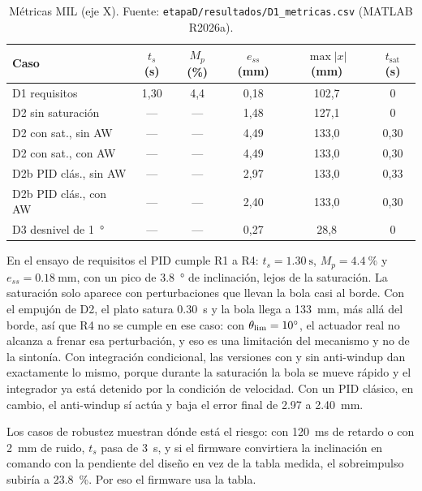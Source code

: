 \begin{table}[!t]
\caption{Métricas MIL (eje X). Fuente: \texttt{etapaD/resultados/D1\_metricas.csv}
(MATLAB R2026a).}
\label{tab:mil}
\centering
\footnotesize
\setlength{\tabcolsep}{2pt}
\begin{tabular}{@{}lccccc@{}}
\toprule
\textbf{Caso} & $t_s$ (\si{\second}) & $M_p$ (\si{\percent}) & $e_{ss}$ (\si{\milli\metre}) & $\max|x|$ (\si{\milli\metre}) & $t_{\mathrm{sat}}$ (\si{\second}) \\
\midrule
D1 requisitos                 & 1,30 & 4,4  & 0,18 & 102,7 & 0 \\
D2 sin saturación             & ---  & ---  & 1,48 & 127,1 & 0 \\
D2 con sat., sin AW           & ---  & ---  & 4,49 & 133,0 & 0,30 \\
D2 con sat., con AW           & ---  & ---  & 4,49 & 133,0 & 0,30 \\
D2b PID clás., sin AW       & ---  & ---  & 2,97 & 133,0 & 0,33 \\
D2b PID clás., con AW       & ---  & ---  & 2,40 & 133,0 & 0,30 \\
D3 desnivel de \SI{1}{\degree} & ---  & ---  & 0,27 & 28,8  & 0 \\
\bottomrule
\end{tabular}
\end{table}

En el ensayo de requisitos el PID cumple R1 a R4: $t_s = \SI{1.30}{\second}$,
$M_p = \SI{4.4}{\percent}$ y $e_{ss} = \SI{0.18}{\milli\metre}$, con un pico de
\SI{3.8}{\degree} de inclinación, lejos de la saturación. La saturación solo aparece con
perturbaciones que llevan la bola casi al borde. Con el empujón de D2, el plato satura
\SI{0.30}{\second} y la bola llega a \SI{133}{\milli\metre}, más allá del borde, así que R4 no se
cumple en ese caso: con
$\theta_{\mathrm{lim}} = \SI{10}{\degree}$, el actuador real no alcanza a frenar esa perturbación, y eso es una
limitación del mecanismo y no de la sintonía. Con integración condicional, las versiones con y sin
anti-windup dan exactamente lo mismo, porque durante la saturación la bola se mueve rápido y el
integrador ya está detenido por la condición de velocidad. Con un PID clásico, en cambio, el
anti-windup sí actúa y baja el error final de \SI{2.97}{} a \SI{2.40}{\milli\metre}.

Los casos de robustez muestran dónde está el riesgo: con \SI{120}{\milli\second} de retardo o con
\SI{2}{\milli\metre} de ruido, $t_s$ pasa de \SI{3}{\second}, y si el firmware convirtiera la
inclinación en comando con la pendiente del diseño en vez de la tabla medida, el sobreimpulso
subiría a \SI{23.8}{\percent}. Por eso el firmware usa la tabla.

